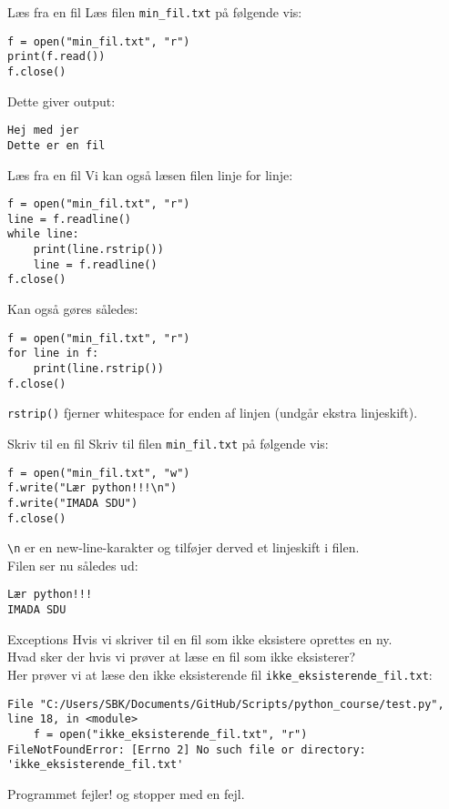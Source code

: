 \begin{frame}[fragile]{Læs fra en fil}
	Læs filen \texttt{min\_fil.txt} på følgende vis:
	\begin{lstlisting}[style=python]
f = open("min_fil.txt", "r")
print(f.read())
f.close()
	\end{lstlisting}
	Dette giver output:
	\begin{lstlisting}[style=python]
Hej med jer
Dette er en fil
	\end{lstlisting}
\end{frame}

\begin{frame}[fragile]{Læs fra en fil}
	Vi kan også læsen filen linje for linje:
	\begin{lstlisting}[style=python]
f = open("min_fil.txt", "r")
line = f.readline()
while line:
	print(line.rstrip())
	line = f.readline()
f.close()
	\end{lstlisting}
	Kan også gøres således:
	\begin{lstlisting}[style=python]
f = open("min_fil.txt", "r")
for line in f:
	print(line.rstrip())
f.close()
	\end{lstlisting}
	\texttt{rstrip()} fjerner whitespace for enden af linjen (undgår ekstra linjeskift).
\end{frame}

\begin{frame}[fragile]{Skriv til en fil}
	Skriv til filen \texttt{min\_fil.txt} på følgende vis:
	\begin{lstlisting}[style=python]
f = open("min_fil.txt", "w")
f.write("Lær python!!!\n")
f.write("IMADA SDU")
f.close()
	\end{lstlisting}
	\texttt{\textbackslash n} er en new-line-karakter og tilføjer derved et linjeskift i filen.\\
	Filen ser nu således ud:
	\begin{lstlisting}[style=python]
Lær python!!!
IMADA SDU
	\end{lstlisting}
\end{frame}

\begin{frame}[fragile]{Exceptions}
	Hvis vi skriver til en fil som ikke eksistere oprettes en ny.\\
	Hvad sker der hvis vi prøver at læse en fil som ikke eksisterer?\\
	\pause
	Her prøver vi at læse den ikke eksisterende fil \texttt{ikke\_eksisterende\_fil.txt}:
	\begin{lstlisting}[style=python]
  File "C:/Users/SBK/Documents/GitHub/Scripts/python_course/test.py", line 18, in <module>
    f = open("ikke_eksisterende_fil.txt", "r")
FileNotFoundError: [Errno 2] No such file or directory: 'ikke_eksisterende_fil.txt'
	\end{lstlisting}
	Programmet fejler! og stopper med en fejl.
\end{frame}

